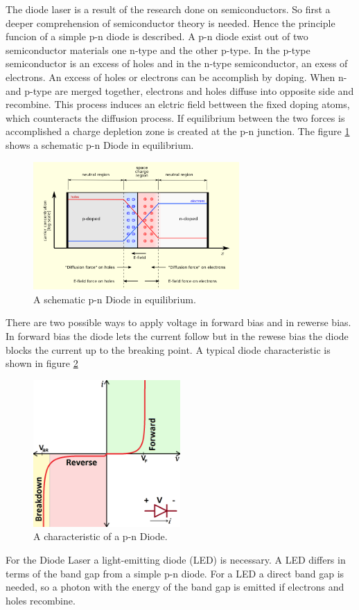 The diode laser is a result of the research done on semiconductors.
So first a deeper comprehension of semiconductor theory is needed.
Hence the principle funcion of a simple p-n diode is described.
A p-n diode exist out of two semiconductor materials one
n-type and the other p-type.
In the p-type semiconductor is an excess of holes
and in the n-type semiconductor, an exess of electrons.
An excess of holes or electrons can be accomplish by doping.
When n- and p-type are merged together,
electrons and holes diffuse into opposite side and recombine.
This process induces an elctric field bettween the fixed doping atoms, which
counteracts the diffusion process.
If equilibrium between the two forces is accomplished
a charge depletion zone is created
at the p-n junction.
The figure \ref{fig:equi} shows
a schematic p-n Diode in equilibrium.

\begin{figure}
\centering
\includegraphics[width=0.7\textwidth]{equilibrium.png}
\caption{A schematic p-n Diode in equilibrium.
\cite{wiki_diode}}
\label{fig:equi}
\end{figure}

There are two possible ways to apply voltage
in forward bias and
in rewerse bias.
In forward bias the diode lets the current follow
but in the rewese bias the diode blocks the current up to the breaking point.
A typical diode characteristic is shown in figure \ref{fig:chara}
\begin{figure}
\centering
\includegraphics[width=0.5\textwidth]{Kennlinie.png}
\caption{A characteristic of a p-n Diode.
\cite{sparkfun}} %
\label{fig:chara}
\end{figure}
For the Diode Laser a light-emitting diode (LED)
is necessary. A LED differs in terms of
the band gap
from a simple p-n diode.
For a LED a direct band gap is needed, so a photon
with the energy of the band gap is
emitted if electrons and holes recombine.

